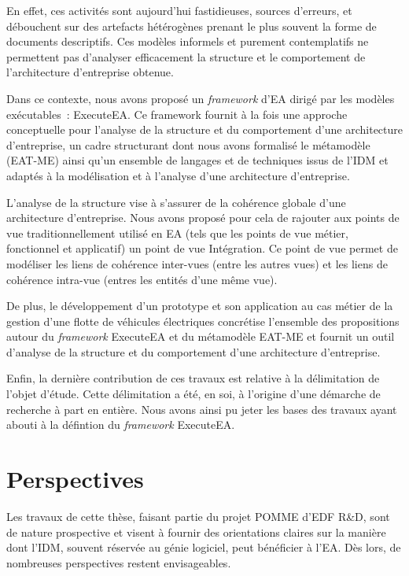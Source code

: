 En effet, ces activités sont aujourd'hui fastidieuses, sources d'erreurs,
et débouchent sur des artefacts hétérogènes prenant le plus souvent la forme
de documents descriptifs. Ces modèles informels et purement contemplatifs
ne permettent pas d'analyser efficacement 
la structure et le comportement de l'architecture d'entreprise obtenue.

Dans ce contexte, nous avons proposé un \emph{framework}
d'EA dirigé par les modèles exécutables~: ExecuteEA. Ce framework fournit à la fois une approche
conceptuelle pour l'analyse de la structure et du comportement d'une architecture d'entreprise, un cadre structurant dont nous
avons formalisé le métamodèle (EAT-ME) ainsi qu'un ensemble de langages et de techniques issus de l'IDM et adaptés à la modélisation
et à l'analyse d'une architecture d'entreprise. 

L'analyse de la structure vise à s'assurer de la cohérence globale d'une architecture d'entreprise. Nous avons
proposé pour cela de rajouter aux points de vue traditionnellement utilisé en EA (tels que les points de vue métier, fonctionnel et
applicatif) un point de vue Intégration. Ce point de vue permet de modéliser les liens de cohérence inter-vues (entre les autres vues)
et les liens de cohérence intra-vue (entres les entités d'une même vue).

De plus, le développement d'un prototype et son application au cas métier
de la gestion d'une flotte de véhicules électriques concrétise l'ensemble des
propositions autour du \emph{framework} ExecuteEA et du métamodèle EAT-ME
et fournit un outil d'analyse de la structure et du comportement
d'une architecture d'entreprise.

Enfin, la dernière contribution de ces travaux est relative à la délimitation de l'objet d'étude.
Cette délimitation a été, en soi, à l'origine d'une démarche de recherche à part en entière.
Nous avons ainsi pu jeter les bases des travaux ayant abouti à la défintion du \emph{framework} ExecuteEA.

\section{Perspectives}

Les travaux de cette thèse, faisant partie du projet POMME d'EDF R\&D, sont de nature prospective et visent à fournir 
des orientations claires sur la manière dont l'IDM, souvent réservée au génie logiciel, peut bénéficier à l'EA.
Dès lors, de nombreuses perspectives restent envisageables.

